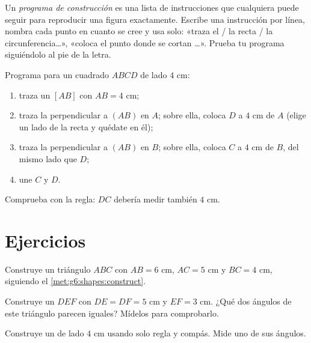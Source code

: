 \begin{method}\label{met:g6:shapes:program}
Un \emph{programa de construcción} es una lista de instrucciones que cualquiera puede
seguir para reproducir una figura exactamente. Escribe una instrucción por línea,
nombra cada punto en cuanto se cree y usa solo: «traza el 
/ la recta / la circunferencia\dots», «coloca el punto donde se cortan \dots». Prueba
tu programa siguiéndolo al pie de la letra.
\end{method}

\begin{example}\label{ex:g6:shapes:program}
Programa para un cuadrado $ABCD$ de lado $4$ cm:
\begin{enumerate}
  \item traza un  $[AB]$ con $AB = 4$ cm;
  \item traza la perpendicular a $(AB)$ en $A$; sobre ella, coloca $D$ a
        $4$ cm de $A$ (elige un lado de la recta y quédate en él);
  \item traza la perpendicular a $(AB)$ en $B$; sobre ella, coloca $C$ a
        $4$ cm de $B$, del mismo lado que $D$;
  \item une $C$ y $D$.
\end{enumerate}
Comprueba con la regla: $DC$ debería medir también $4$ cm.
\end{example}

\section{Ejercicios}

\begin{exercise}[$\star$]\label{exo:g6:shapes:1}
Construye un triángulo $ABC$ con $AB = 6$ cm, $AC = 5$ cm y
$BC = 4$ cm, siguiendo el \cref{met:g6:shapes:construct}.
\end{exercise}

\begin{exercise}[$\star$]\label{exo:g6:shapes:2}
Construye un  $DEF$ con $DE = DF = 5$ cm y
$EF = 3$ cm. ¿Qué dos ángulos de este triángulo parecen iguales? Mídelos
para comprobarlo.
\end{exercise}

\begin{exercise}[$\star$]\label{exo:g6:shapes:3}
Construye un  de lado $4$ cm usando solo regla y
compás. Mide uno de sus ángulos.
\end{exercise}


